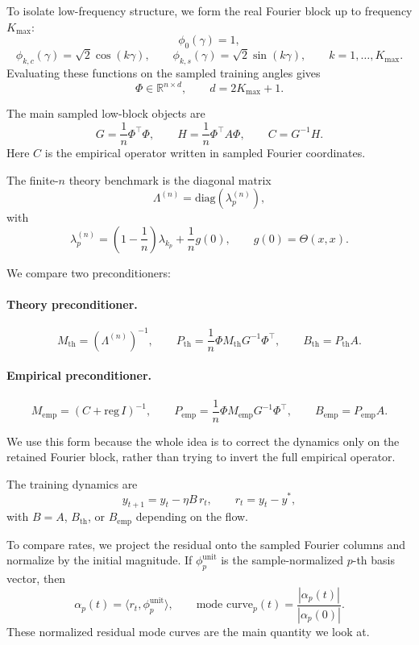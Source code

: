 \documentclass[11pt]{article}
\begin{document}
To isolate low-frequency structure, we form the real Fourier block up to
frequency $K_{\max}$:
\[
	\phi_0(\gamma)=1,
\]
\[
	\phi_{k,c}(\gamma)=\sqrt{2}\cos(k\gamma),
	\qquad
	\phi_{k,s}(\gamma)=\sqrt{2}\sin(k\gamma),
	\qquad k=1,\dots,K_{\max}.
\]
Evaluating these functions on the sampled training angles gives
\[
	\Phi \in \mathbb{R}^{n\times d},
	\qquad
	d=2K_{\max}+1.
\]

The main sampled low-block objects are
\[
	G=\frac{1}{n}\Phi^\top\Phi,
	\qquad
	H=\frac{1}{n}\Phi^\top A\Phi,
	\qquad
	C=G^{-1}H.
\]
Here $C$ is the empirical operator written in sampled Fourier coordinates.

The finite-$n$ theory benchmark is the diagonal matrix
\[
	\Lambda^{(n)}=\mathrm{diag}(\lambda_p^{(n)}),
\]
with
\[
	\lambda_p^{(n)}
	=
	\left(1-\frac{1}{n}\right)\lambda_{k_p}
	+
	\frac{1}{n}g(0),
	\qquad
	g(0)=\Theta(x,x).
\]

We compare two preconditioners:

\paragraph{Theory preconditioner.}
\[
	M_{\mathrm{th}}=(\Lambda^{(n)})^{-1},
	\qquad
	P_{\mathrm{th}}=\frac{1}{n}\Phi M_{\mathrm{th}} G^{-1}\Phi^\top,
	\qquad
	B_{\mathrm{th}}=P_{\mathrm{th}}A.
\]

\paragraph{Empirical preconditioner.}
\[
	M_{\mathrm{emp}}=(C+\mathrm{reg}\,I)^{-1},
	\qquad
	P_{\mathrm{emp}}=\frac{1}{n}\Phi M_{\mathrm{emp}} G^{-1}\Phi^\top,
	\qquad
	B_{\mathrm{emp}}=P_{\mathrm{emp}}A.
\]

We use this form because the whole idea is to correct the dynamics only on the
retained Fourier block, rather than trying to invert the full empirical operator.

The training dynamics are
\[
	y_{t+1}=y_t-\eta B\,r_t,
	\qquad
	r_t=y_t-y^*,
\]
with $B=A$, $B_{\mathrm{th}}$, or $B_{\mathrm{emp}}$ depending on the flow.

To compare rates, we project the residual onto the sampled Fourier columns and
normalize by the initial magnitude. If $\phi_p^{\mathrm{unit}}$ is the
sample-normalized $p$-th basis vector, then
\[
	\alpha_p(t)=\langle r_t,\phi_p^{\mathrm{unit}}\rangle,
	\qquad
	\text{mode curve}_p(t)=\frac{|\alpha_p(t)|}{|\alpha_p(0)|}.
\]
These normalized residual mode curves are the main quantity we look at.
\end{document}
